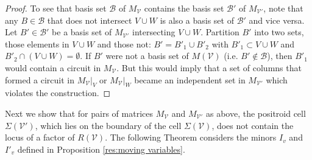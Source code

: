 \documentclass[11pt]{article}
\newcommand{\cV}{\mathcal{V}}
\newcommand{\cB}{\mathcal{B}}
\newcommand{\Rows}{\textrm{Row}}
\theoremstyle{remark}
\theoremstyle{definition}
\begin{document}
\begin{proof}
\begin{comment}
\emph{Proof of claim:}Suppose, for contradiction, $I_j = I'_j$. Write $I_j = v_1 \ldots v_k$ with $v_i <_j v_{i+1}$. By definition fo the Grassmann necklace, $a$ is the first column in the $>_j$ ordering of the columns of $C$ that is not contained in the flat defined by previous elements of $I_j$: $\textrm{cl}(\{v_i | v_i <_j a \})$ in $M(C)$. In $C'$, the non-zero entries in the column $a$ lie in the rows where $V$ has non-zero entries: $\Rows(a) \subset \Rows(V)$. Since $a \in I'_j$, the flat $V \cup W$ in $M(C')$ is not contained in the the flat defined by the previous elements of $I'_j$: $V \cup W \not \subset \textrm{cl}(\{v_i | v_i <_j a )$ in $M(C')$. Since $\Rows(V \cup W)$ in $C'$ is the same as $\Rows(V)$ in $C$, the flat defined by $V$ in $M(C)$ is is not contained in the the flat defined by the previous elements of $I_j$: $V\not \subset \textrm{cl}(\{v_i | v_i <_j a ) \}$ in $M(C)$. \todo{is $U$ uniquely defined?} Let $U \subset I_j$ be the smallest subset of $I_j$ that is needed to ensure that $V \subset \textrm{cl}(\{v_i | v_i <_j a \} \cup U)$ in $M(C)$. Note that $a$ preceeds all elements of $U$, by construction s $a \leq_j u$ for all $u \in U$ in $M(C)$. However, also by construction, $a \in U$ in $M(C')$. Therefore, there must be some $b \in U$ that is in $M(C)$ but not in $M(C')$, thus violating $I_j = I'_j$.
\end{comment} 

To see that basis set $\cB$ of $M_\cV$ contains the basis set $\cB'$ of $M_{\cV'}$, note that any $B \in \cB$ that does not intersect $V \cup W$ is also a basis set of $\cB'$ and vice versa. Let $B' \in \cB'$ be a basis set of $M_{\cV'}$ intersecting $V\cup W$. Partition $B'$ into two sets, those elements in $V \cup W$  and those not: $B' = B'_1 \cup B'_2$ with $B'_1 \subset V \cup W$ and $B'_2 \cap (V \cup W) = \emptyset$. If $B'$ were not a basis set of $M(\cV)$ (i.e. $B' \not \in \cB$), then $B'_1$ would contain a circuit in $M_\cV$. But this would imply that a set of columns that formed a circuit in $M_{\cV}|_V$ or $M_\cV|_W$ became an independent set in $M_{\cV'}$ which violates the construction.
\end{proof}

Next we show that for pairs of matrices $M_{\cV}$ and $M_{\cV'}$ as above, the positroid cell $\Sigma(\cV')$, which lies on the boundary of the cell $\Sigma(\cV)$, does not contain the locus of a factor of $R(\cV)$. The following Theorem considers the minors $I_v$ and $I'_v$ defined in Proposition \ref{res:moving variables}. 
\end{document}
